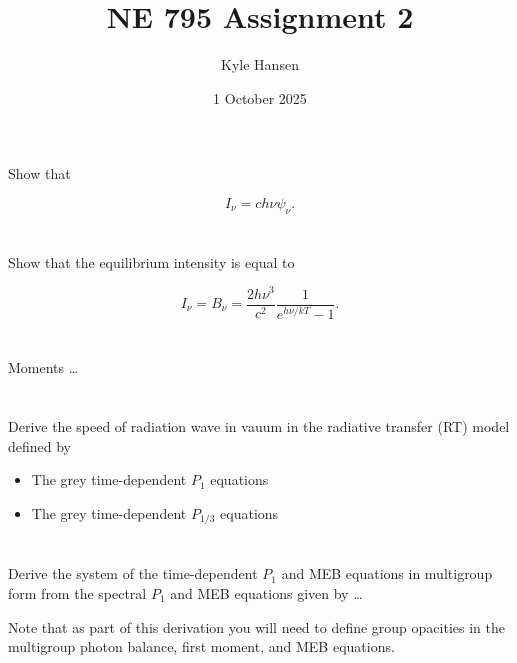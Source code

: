 \documentclass{template}
\title{NE 795 Assignment 2}
\author{Kyle Hansen}
\date{1 October 2025}
\begin{document}
\maketitle

\section{} Show that 

\[
    I_\nu = ch\nu\psi_\nu.
\]


\section{}

Show that the equilibrium intensity is equal to

\[
    I_\nu = B_\nu = \frac{2h\nu^3}{c^2}\frac{1}{e^{h\nu/kT}-1}.
\]


\section{} Moments \dots

\section{} Derive the speed of radiation wave in vauum in the radiative transfer (RT) model defined by

\begin{itemize}
    \item The grey time-dependent $P_1$ equations
    \item The grey time-dependent $P_{1/3}$ equations
\end{itemize}



\section{} Derive the system of the time-dependent $P_1$ and MEB equations in multigroup form from the spectral $P_1$ and MEB equations given by \dots

Note that as part of this derivation you will need to define group opacities in the multigroup photon balance, first moment, and MEB equations.
\end{document}
